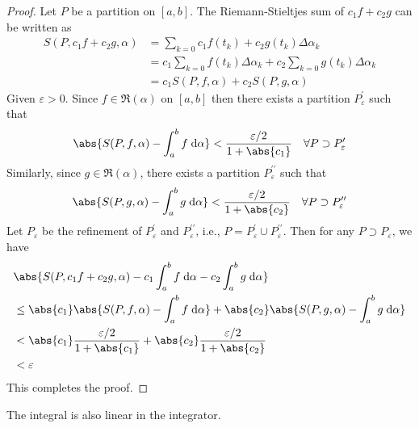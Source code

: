 \documentclass[thmcnt=section, 12pt]{elegantbook}
\begin{document}
\begin{proof}
    Let $P$ be a partition on $[a,b]$. The Riemann-Stieltjes sum of $c_1 f + c_2 g$ can be written as 
    \begin{align*}
        S(P, c_1 f + c_2 g, \alpha)
        &= \sum_{k=0} c_1 f(t_k) + c_2 g(t_k) \Delta\alpha_k \\ 
        &= c_1 \sum_{k=0} f(t_k) \Delta\alpha_k
        + c_2 \sum_{k=0} g(t_k) \Delta\alpha_k \\ 
        &= c_1 S(P, f, \alpha) + c_2 S(P, g, \alpha)
    \end{align*}
    Given $\varepsilon > 0$. Since $f \in \mathfrak{R}(\alpha)$ on $[a,b]$ then there exists a partition $P_\varepsilon^{\prime}$
    such that 
    \begin{align*}
        \abs{S(P, f, \alpha) - \int_a^b f \; \mathrm{d}\alpha} < \frac{\varepsilon / 2}{1 + \abs{c_1}}
        \quad \forall P \supset P_\varepsilon^{\prime}
    \end{align*}
    Similarly, since $g \in \mathfrak{R}(\alpha)$, there exists a partition $P_\varepsilon^{\prime\prime}$ such that 
    \begin{align*}
        \abs{S(P, g, \alpha) - \int_a^b g \; \mathrm{d}\alpha} < \frac{\varepsilon / 2}{1 + \abs{c_2}}
        \quad \forall P \supset P_\varepsilon^{\prime\prime}
    \end{align*}
    Let $P_\varepsilon$ be the refinement of $P_\varepsilon^{\prime}$ and $P_\varepsilon^{\prime\prime}$, i.e., $P = P_\varepsilon^{\prime} \cup P_\varepsilon^{\prime\prime}$. Then for any $P \supset P_\varepsilon$, we have 
    \begin{align*}
        &\abs{
            S(P, c_1 f + c_2 g, \alpha) 
            - c_1 \int_a^b f \; \mathrm{d}\alpha
            - c_2 \int_a^b g \; \mathrm{d}\alpha
        } \\
        &\leq \abs{c_1} \abs{S(P,f,\alpha) - \int_a^b f \; \mathrm{d}\alpha}
        + \abs{c_2} \abs{S(P,g,\alpha) - \int_a^b g \; \mathrm{d}\alpha} \\ 
        &< \abs{c_1} \frac{\varepsilon / 2}{1 + \abs{c_1}}
        + \abs{c_2} \frac{\varepsilon / 2}{1 + \abs{c_2}} \\ 
        &< \varepsilon
    \end{align*}
    This completes the proof.
\end{proof}


\par The integral is also linear in the integrator.
\end{document}
